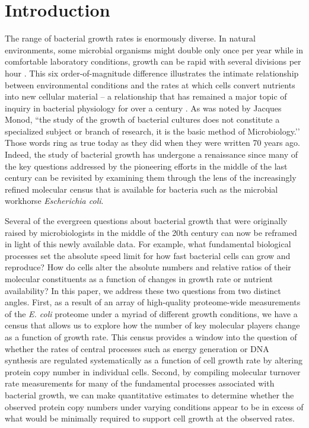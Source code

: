 \section{Introduction}
The range of bacterial growth rates is enormously diverse. In natural
environments, some microbial organisms might double only once per year
\citep{mikucki2009} while in comfortable laboratory conditions, growth can be
rapid with several divisions per hour \citep{schaechter1958}. This six
order-of-magnitude difference illustrates the intimate relationship between
environmental conditions and the rates at which cells convert nutrients into new
cellular material -- a relationship that has remained a major topic of inquiry
in bacterial physiology for over a century \citep{jun2018}. As was noted by
Jacques Monod, ``the study of the growth of bacterial cultures does not
constitute a specialized subject or branch of research, it is the basic method
of Microbiology.’’ \citep{monod1949} Those words ring as true today as they did
when they were written 70 years ago. Indeed, the study of bacterial growth has
undergone a renaissance since many of the key questions addressed by the
pioneering efforts in the middle of the last century can be revisited by
examining them through the lens of the increasingly refined molecular census
that is available for bacteria such as the microbial workhorse
\textit{Escherichia coli}.

Several of the evergreen questions about bacterial growth that were originally
raised by microbiologists in the middle of the 20th century can now be reframed
in light of this newly available data. For example, what fundamental biological
processes set the absolute speed limit for how fast bacterial cells can grow and
reproduce? How do cells alter the absolute numbers and relative ratios of their
molecular constituents as a function of changes in growth rate or nutrient
availability? In this paper, we address these two questions from two distinct
angles. First, as a result of an array of high-quality proteome-wide
measurements of the \textit{E. coli} proteome under a myriad of different growth
conditions, we have a census that allows us to explore how the number of key
molecular players change as a function of growth rate. This census provides a
window into the question of whether the rates of central processes such as
energy generation or DNA synthesis are regulated systematically as a function of
cell growth rate by altering protein copy number in individual cells. Second, by
compiling molecular turnover rate measurements for many of the fundamental
processes associated with bacterial growth, we can make quantitative estimates
to determine whether the observed protein copy numbers under varying conditions
appear to be in excess of what would be minimally required to support cell
growth at the observed rates.

